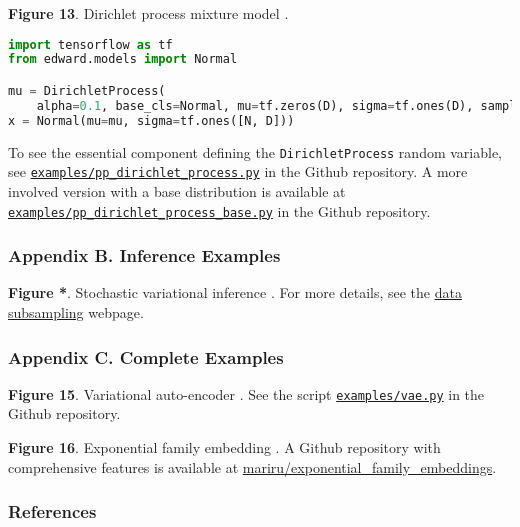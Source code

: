 \textbf{Figure 13}. Dirichlet process mixture model \citep{antoniak1974mixtures}.
\begin{lstlisting}[language=python]
import tensorflow as tf
from edward.models import Normal

mu = DirichletProcess(
    alpha=0.1, base_cls=Normal, mu=tf.zeros(D), sigma=tf.ones(D), sample_n=N)
x = Normal(mu=mu, sigma=tf.ones([N, D]))
\end{lstlisting}
To see the essential component defining the \texttt{DirichletProcess}
random variable, see
\href{https://github.com/blei-lab/edward/blob/master/examples/pp_dirichlet_process.py}{\texttt{examples/pp_dirichlet_process.py}}
in the Github repository.
A more involved version with a base distribution is available at
\href{https://github.com/blei-lab/edward/blob/master/examples/pp_dirichlet_process_base.py}{\texttt{examples/pp_dirichlet_process_base.py}}
in the Github repository.

\subsubsection{Appendix B. Inference Examples}

\textbf{Figure *}. Stochastic variational inference \citep{hoffman2013stochastic}.
For more details, see the
\href{/api/data-subsampling}{data subsampling} webpage.

\subsubsection{Appendix C. Complete Examples}

\textbf{Figure 15}. Variational auto-encoder
\citep{kingma2014auto,rezende2014stochastic}.
See the script
\href{https://github.com/blei-lab/edward/blob/master/examples/vae.py}{\texttt{examples/vae.py}}
in the Github repository.

\textbf{Figure 16}. Exponential family embedding \citep{rudolph2016exponential}.
A Github repository with comprehensive features is available at
\href{https://github.com/mariru/exponential_family_embeddings}{mariru/exponential_family_embeddings}.

\subsubsection{References}\label{references}
